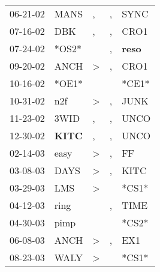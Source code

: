 \begin{supertabular}{p{0.07\textwidth}p{0.06\textwidth}p{0.02\textwidth}p{0.02\textwidth}p{0.06\textwidth}}
 06-21-02\textsuperscript{} &           MANS\textsuperscript{} &                , &             , &           SYNC\textsuperscript{} \\
 07-16-02\textsuperscript{} &            DBK\textsuperscript{} &                , &             , &           CRO1\textsuperscript{} \\
 07-24-02\textsuperscript{} &                            *OS2* &                  &             , &  \textbf{reso\textsuperscript{}} \\
 09-20-02\textsuperscript{} &           ANCH\textsuperscript{} &     \textgreater &             , &           CRO1\textsuperscript{} \\
 10-16-02\textsuperscript{} &                            *OE1* &                  &               &                            *CE1* \\
 10-31-02\textsuperscript{} &            n2f\textsuperscript{} &     \textgreater &             , &           JUNK\textsuperscript{} \\
 11-23-02\textsuperscript{} &           3WID\textsuperscript{} &                , &             , &           UNCO\textsuperscript{} \\
 12-30-02\textsuperscript{} &  \textbf{KITC\textsuperscript{}} &                , &             , &           UNCO\textsuperscript{} \\
 02-14-03\textsuperscript{} &           easy\textsuperscript{} &     \textgreater &             , &             FF\textsuperscript{} \\
 03-08-03\textsuperscript{} &           DAYS\textsuperscript{} &     \textgreater &             , &           KITC\textsuperscript{} \\
 03-29-03\textsuperscript{} &            LMS\textsuperscript{} &     \textgreater &               &                            *CS1* \\
 04-12-03\textsuperscript{} &           ring\textsuperscript{} &                  &             , &           TIME\textsuperscript{} \\
 04-30-03\textsuperscript{} &           pimp\textsuperscript{} &                  &               &                            *CS2* \\
 06-08-03\textsuperscript{} &           ANCH\textsuperscript{} &     \textgreater &             , &            EX1\textsuperscript{} \\
 08-23-03\textsuperscript{} &           WALY\textsuperscript{} &     \textgreater &               &                            *CS1* \\

\end{supertabular}
